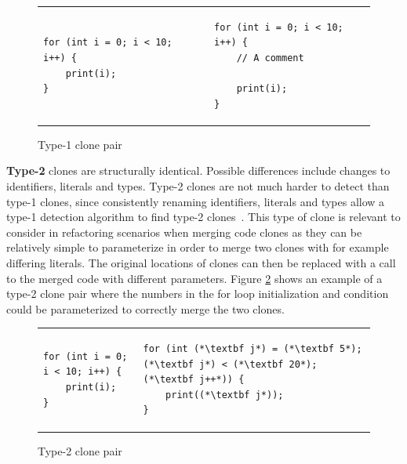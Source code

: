 \begin{figure}[t]
	\begin{center}
        \begin{tabular}{p{5cm} | p{5cm}}
			\begin{lstlisting}
for (int i = 0; i < 10;   i++) {
    print(i);
}
\end{lstlisting} &
			\begin{lstlisting}
for (int i = 0; i < 10; i++) {
    // A comment

    print(i);
}
            \end{lstlisting}
		\end{tabular}
	\end{center}
    \caption{Type-1 clone pair}
    \label{fig:type1clone}
\end{figure}


\textbf{Type-2} clones are structurally identical. Possible differences include changes to
identifiers, literals and types. Type-2 clones are not much harder to detect than type-1
clones, since consistently renaming identifiers, literals and types allow a type-1
detection algorithm to find type-2 clones~\cite{Bakerdup}. This type of clone is relevant
to consider in refactoring scenarios when merging code clones as they can be relatively
simple to parameterize in order to merge two clones with for example differing literals.
The original locations of clones can then be replaced with a call to the merged code with
different parameters. Figure \ref{fig:type2clone} shows an example of a type-2 clone pair
where the numbers in the for loop initialization and condition could be parameterized to
correctly merge the two clones.

\begin{figure}[t]
	\begin{center}
        \begin{tabular}{p{5cm} | p{5cm}}
\begin{lstlisting}
for (int i = 0; i < 10; i++) {
    print(i);
}
\end{lstlisting} & \begin{lstlisting}
for (int (*\textbf j*) = (*\textbf 5*); (*\textbf j*) < (*\textbf 20*); (*\textbf j++*)) {
    print((*\textbf j*));
}
\end{lstlisting}
		\end{tabular}
	\end{center}
	\caption{Type-2 clone pair}
	\label{fig:type2clone}
\end{figure}

